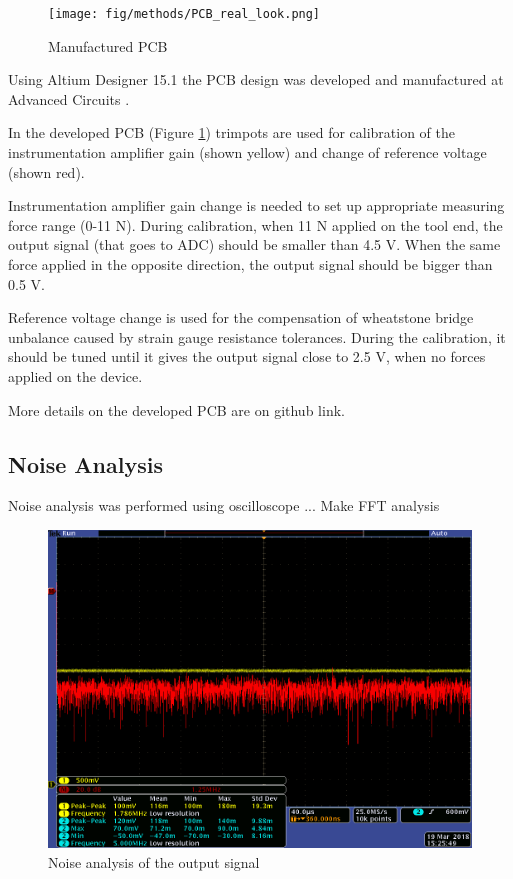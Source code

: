 \begin{figure}[h]
	\begin{center}
		\texttt{[image: fig/methods/PCB\_real\_look.png]}
	\end{center}
	\vspace{-4mm}
	\caption[Manufactured PCB]
	{Manufactured PCB}
	\label{fig:PCB_real}
	\vspace{-2mm}
\end{figure}
	
Using Altium Designer 15.1 the PCB design was developed and manufactured at Advanced Circuits \cite{PCB_manufacturer}. 

In the developed PCB (Figure \ref{fig:PCB_real}) trimpots are used for calibration of the instrumentation amplifier gain (shown yellow) and change of reference voltage (shown red).

Instrumentation amplifier gain change is needed to set up appropriate measuring force range (0-11 N). During calibration, when 11 N applied on the tool end, the output signal (that goes to ADC) should be smaller than 4.5 V. When the same force applied in the opposite direction, the output signal should be bigger than 0.5 V.
 
Reference voltage change is used for the compensation of wheatstone bridge unbalance caused by strain gauge resistance tolerances. During the calibration, it should be tuned until it gives the output signal close to 2.5 V, when no forces applied on the device.

More details on the developed PCB are on github link.

	\subsection{Noise Analysis}
	\label{sec:NoiseExp}
	Noise analysis was performed using oscilloscope ... Make FFT analysis

		\begin{figure}[h]
			\begin{center}
			\includegraphics[width=120mm]{fig/results/40us_1stADC.png}
			\end{center}
			\vspace{-4mm}
		\caption[Noise analysis of the output signal]
		{Noise analysis of the output signal}
		\label{fig:OutputSignal}
		\vspace{-2mm}
		\end{figure}

